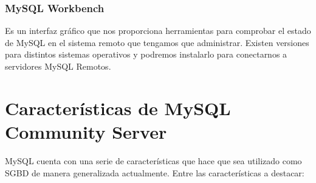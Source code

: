 \subsubsection{MySQL Workbench}
Es un interfaz gráfico que nos proporciona herramientas para comprobar el estado de MySQL en el sistema remoto que tengamos que administrar. Existen versiones para distintos sistemas operativos y podremos instalarlo para conectarnos a servidores MySQL Remotos.

\section{Características de MySQL Community Server}
MySQL cuenta con una serie de características que hace que sea utilizado como SGBD de manera generalizada actualmente. Entre las características a destacar:

